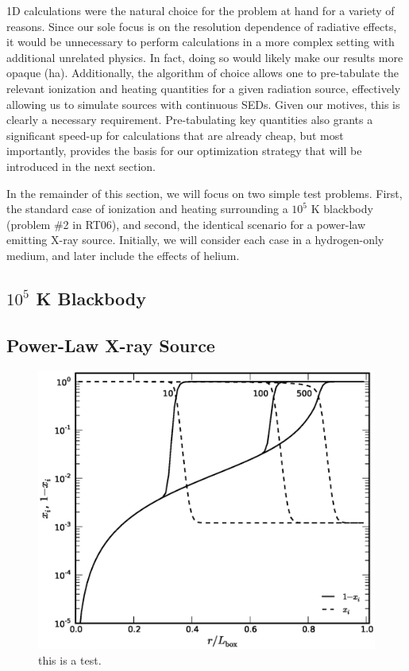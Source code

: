 \documentclass[preprint2]{aastex}              %
\begin{document}
1D calculations were the natural choice for the problem at hand for a variety of reasons.  Since our sole focus is on the resolution dependence of radiative effects, it would be unnecessary to perform calculations in a more complex setting with additional unrelated physics.  In fact, doing so would likely make our results more opaque (ha).  Additionally, the algorithm of choice allows one to pre-tabulate the relevant ionization and heating quantities for a given radiation source, effectively allowing us to simulate sources with continuous SEDs.  Given our motives, this is clearly a necessary requirement.  Pre-tabulating key quantities also grants a significant speed-up for calculations that are already cheap, but most importantly, provides the basis for our optimization strategy that will be introduced in the next section.

In the remainder of this section, we will focus on two simple test problems.  First, the standard case of ionization and heating surrounding a $10^5$ K blackbody (problem \#2 in RT06), and second, the identical scenario for a power-law emitting X-ray source.  Initially, we will consider each case in a hydrogen-only medium, and later include the effects of helium.

\subsection{$10^5$ K Blackbody}



\subsection{Power-Law X-ray Source}

\begin{figure}[htbp]
\begin{center}
\includegraphics[scale=0.4]{figures/RT_Test1_RadialProfiles.ps}
\caption{this is a test.}
\label{fig:test}
\end{center}
\end{figure}
\end{document}

